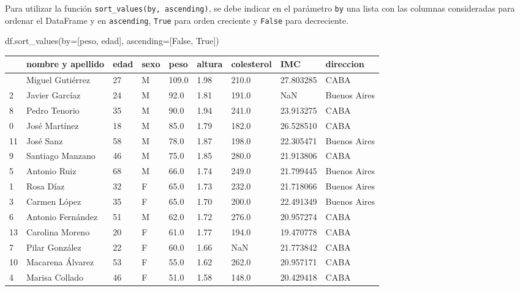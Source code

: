 \documentclass[
  letterpaper,
  DIV=11,
  numbers=noendperiod]{scrreprt}
\newenvironment{Shaded}{\begin{snugshade}}{\end{snugshade}}
\newcommand{\NormalTok}[1]{\textcolor[rgb]{0.00,0.23,0.31}{#1}}
\newcommand{\OperatorTok}[1]{\textcolor[rgb]{0.37,0.37,0.37}{#1}}
\newcommand{\StringTok}[1]{\textcolor[rgb]{0.13,0.47,0.30}{#1}}
\newcommand{\VariableTok}[1]{\textcolor[rgb]{0.07,0.07,0.07}{#1}}
\begin{document}
Para utilizar la función \texttt{sort\_values(by,\ ascending)}, se debe
indicar en el parámetro \texttt{by} una lista con las columnas
consideradas para ordenar el DataFrame y en \texttt{ascending},
\texttt{True} para orden creciente y \texttt{False} para decreciente.

\begin{Shaded}
\begin{Highlighting}[]
\NormalTok{df.sort\_values(by}\OperatorTok{=}\NormalTok{[}\StringTok{\textquotesingle{}peso\textquotesingle{}}\NormalTok{, }\StringTok{\textquotesingle{}edad\textquotesingle{}}\NormalTok{], ascending}\OperatorTok{=}\NormalTok{[}\VariableTok{False}\NormalTok{, }\VariableTok{True}\NormalTok{])}
\end{Highlighting}
\end{Shaded}

\begin{longtable}[]{@{}lllllllll@{}}
\toprule\noalign{}
& nombre y apellido & edad & sexo & peso & altura & colesterol & IMC &
direccion \\
\midrule\noalign{}
\endhead
\bottomrule\noalign{}
\endlastfoot
12 & Miguel Gutiérrez & 27 & M & 109.0 & 1.98 & 210.0 & 27.803285 &
CABA \\
2 & Javier Garcíaz & 24 & M & 92.0 & 1.81 & 191.0 & NaN & Buenos
Aires \\
8 & Pedro Tenorio & 35 & M & 90.0 & 1.94 & 241.0 & 23.913275 & CABA \\
0 & José Martínez & 18 & M & 85.0 & 1.79 & 182.0 & 26.528510 & CABA \\
11 & José Sanz & 58 & M & 78.0 & 1.87 & 198.0 & 22.305471 & Buenos
Aires \\
9 & Santiago Manzano & 46 & M & 75.0 & 1.85 & 280.0 & 21.913806 &
CABA \\
5 & Antonio Ruiz & 68 & M & 66.0 & 1.74 & 249.0 & 21.799445 & Buenos
Aires \\
1 & Rosa Díaz & 32 & F & 65.0 & 1.73 & 232.0 & 21.718066 & Buenos
Aires \\
3 & Carmen López & 35 & F & 65.0 & 1.70 & 200.0 & 22.491349 & Buenos
Aires \\
6 & Antonio Fernández & 51 & M & 62.0 & 1.72 & 276.0 & 20.957274 &
CABA \\
13 & Carolina Moreno & 20 & F & 61.0 & 1.77 & 194.0 & 19.470778 &
CABA \\
7 & Pilar González & 22 & F & 60.0 & 1.66 & NaN & 21.773842 & CABA \\
10 & Macarena Álvarez & 53 & F & 55.0 & 1.62 & 262.0 & 20.957171 &
CABA \\
4 & Marisa Collado & 46 & F & 51.0 & 1.58 & 148.0 & 20.429418 & CABA \\
\end{longtable}
\end{document}
